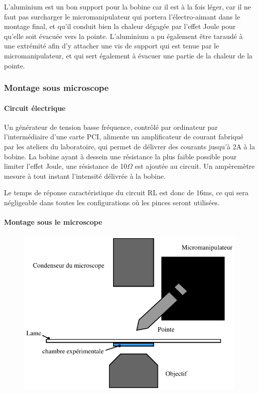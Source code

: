 \documentclass{report}
\begin{document}
		L'aluminium est un bon support pour la bobine car il est à la fois léger, car il ne faut pas surcharger le micromanipulateur qui portera l'électro-aimant dans le montage final, et qu'il conduit bien la chaleur dégagée par l'effet Joule pour qu'elle soit évacuée vers la pointe. L'aluminium a pu également être taraudé à une extrémité afin d'y attacher une vis de support qui est tenue par le micromanipulateur, et qui sert également à évacuer une partie de la chaleur de la pointe.                       
		\subsubsection{Montage sous microscope}
		\paragraph{Circuit électrique}
		
		Un générateur de tension basse fréquence, contrôlé par ordinateur par l'intermédiaire d'une carte PCI, alimente un amplificateur de courant fabriqué par les ateliers du laboratoire, qui permet de délivrer des courants jusqu'à 2A à la bobine. 
		La bobine ayant à dessein une résistance la plus faible possible pour limiter l'effet Joule, une résistance de 10$\Omega$ est ajoutée au circuit. Un ampèremètre mesure à tout instant l'intensité délivrée à la bobine. 
		
		Le temps de réponse caractéristique du circuit RL est donc de 16ms, ce qui sera négligeable dans toutes les configurations où les pinces seront utilisées. 
		
		 \paragraph{Montage sous le microscope}
		 
		 \begin{figure}
		 \includegraphics[scale=1]{montageglobal.pdf}
		 \label{montage global}
		 \end{figure}
		 
\end{document}
